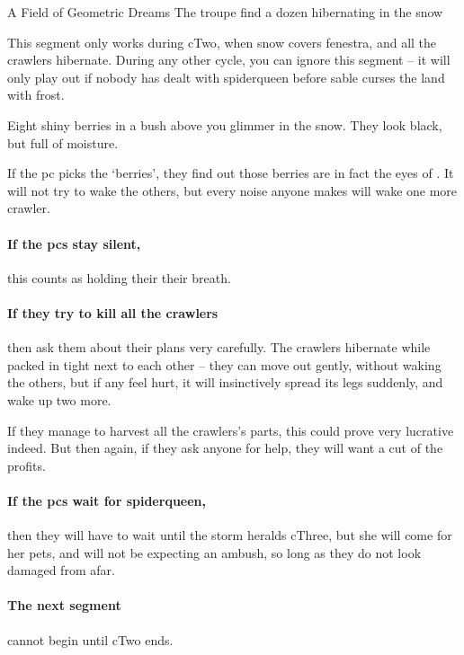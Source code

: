 {A Field of Geometric Dreams}%
{The troupe find a dozen hibernating  in the snow}%
\label{spiderDreams}

This \gls{segment} only works during \gls{cTwo}, when \gls{snow} covers \gls{fenestra}, and all the \glspl{crawler} hibernate.
During any other \gls{cycle}, you can ignore this \gls{segment} -- it will only play out if nobody has dealt with \gls{spiderqueen} before \gls{sable} curses the land with frost.

\begin{boxtext}
	Eight shiny berries in a bush above you glimmer in the snow.
	They look black, but full of moisture.
\end{boxtext}

If the \gls{pc} picks the `berries', they find out those berries are in fact the eyes of .
It will not try to wake the others, but every noise anyone makes will wake one more \gls{crawler}.

\paragraph{If the \glspl{pc} stay silent,}
this counts as holding their their breath.%

\paragraph{If they try to kill all the \glspl{crawler}}
then ask them about their plans very carefully.
The \glspl{crawler} hibernate while packed in tight next to each other -- they can move out gently, without waking the others, but if any feel hurt, it will insinctively spread its legs suddenly, and wake up two more.



If they manage to harvest all the \glspl{crawler}'s parts, this could prove very lucrative indeed.
But then again, if they ask anyone for help, they will want a cut of the profits.

\paragraph{If the \glspl{pc} wait for \gls{spiderqueen},}
then they will have to wait until the \gls{storm} heralds \gls{cThree}, but she will come for her pets, and will not be expecting an ambush, so long as they do not look damaged from afar.

\paragraph{The next \gls{segment}}
cannot begin until \gls{cTwo} ends.
